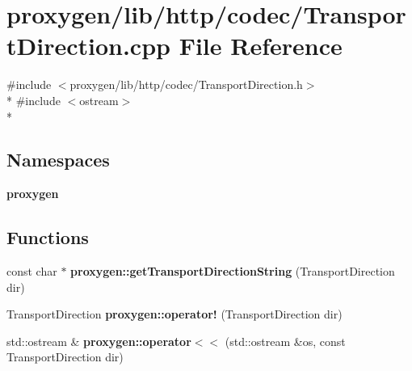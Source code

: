 \section{proxygen/lib/http/codec/\+Transport\+Direction.cpp File Reference}
\label{TransportDirection_8cpp}
{\ttfamily \#include $<$proxygen/lib/http/codec/\+Transport\+Direction.\+h$>$}\\*
{\ttfamily \#include $<$ostream$>$}\\*
\subsection*{Namespaces}
\begin{DoxyCompactItemize}
\item 
 {\bf proxygen}
\end{DoxyCompactItemize}
\subsection*{Functions}
\begin{DoxyCompactItemize}
\item 
const char $\ast$ {\bf proxygen\+::get\+Transport\+Direction\+String} (Transport\+Direction dir)
\item 
Transport\+Direction {\bf proxygen\+::operator!} (Transport\+Direction dir)
\item 
std\+::ostream \& {\bf proxygen\+::operator$<$$<$} (std\+::ostream \&os, const Transport\+Direction dir)
\end{DoxyCompactItemize}
